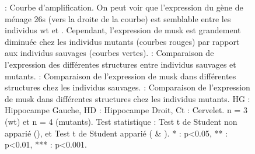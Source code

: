 \begin{figure}[h]
{				 : Courbe d'amplification. On peut voir que l'expression du gène de ménage \acrshort{26s} (vers la droite de la courbe) est semblable entre les individus \gls{wt} et \mcrd. Cependant, l'expression de \gls{musk} est grandement diminuée chez les individus mutants (courbes rouges) par rapport aux individus sauvages (courbes vertes).
				 : Comparaison de l'expression des différentes structures entre individus sauvages et mutants.
				 : Comparaison de l'expression de \gls{musk} dans différentes structures chez les individus sauvages.
				 : Comparaison de l'expression de \gls{musk} dans différentes structures chez les individus mutants.
				HG : Hippocampe Gauche, HD : Hippocampe Droit, Ct : Cervelet. n = 3 (\gls{wt}) et n = 4 (mutants). Test statistique : Test t de Student non apparié (), et Test t de Student apparié ( \& ). * : p<0.05, ** : p<0.01, *** : p<0.001. 
				}
		\label{fig:ExpressionMuSK}
	\end{figure}
\FloatBarrier
